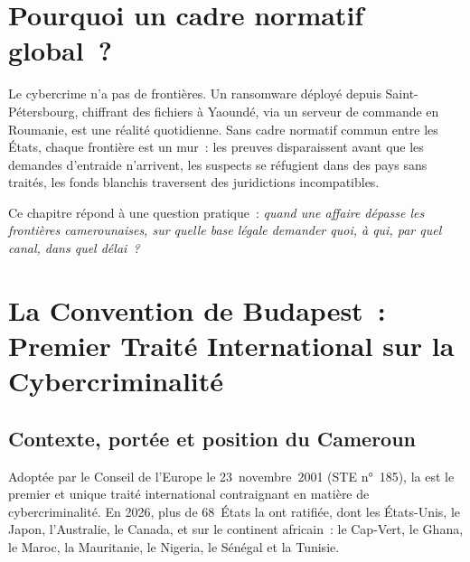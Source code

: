 \bigskip

\section*{Pourquoi un cadre normatif global~?}

Le cybercrime n'a pas de frontières. Un ransomware déployé depuis
Saint-Pétersbourg, chiffrant des fichiers à Yaoundé, via un serveur de
commande en Roumanie, est une réalité quotidienne. Sans cadre normatif
commun entre les États, chaque frontière est un mur~: les preuves
disparaissent avant que les demandes d'entraide n'arrivent, les suspects
se réfugient dans des pays sans traités, les fonds blanchis traversent
des juridictions incompatibles.

Ce chapitre répond à une question pratique~: \emph{quand une affaire
dépasse les frontières camerounaises, sur quelle base légale demander
quoi, à qui, par quel canal, dans quel délai~?}

\separateur

\section{La Convention de Budapest~: Premier Traité International
sur la Cybercriminalité}
\label{sec:budapest}

\subsection{Contexte, portée et position du Cameroun}

Adoptée par le Conseil de l'Europe le 23~novembre~2001 (STE n°~185),
la  est
le premier et unique traité international contraignant en matière de
cybercriminalité. En 2026, plus de 68~États la ont ratifiée, dont les
États-Unis, le Japon, l'Australie, le Canada, et sur le continent
africain~: le Cap-Vert, le Ghana, le Maroc, la Mauritanie, le Nigeria,
le Sénégal et la Tunisie.

